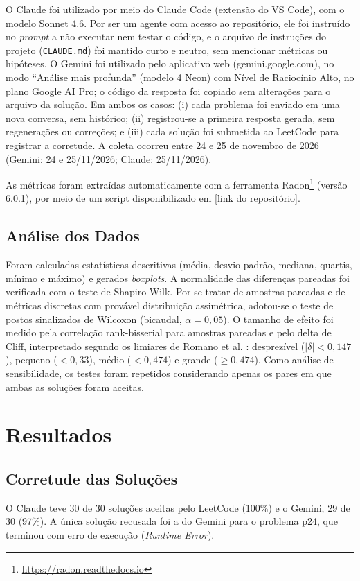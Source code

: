 \documentclass[12pt]{article}
\begin{document}
O Claude foi utilizado por meio do Claude Code (extensão do VS Code), com o modelo Sonnet 4.6.
Por ser um agente com acesso ao repositório, ele foi instruído no \emph{prompt} a não executar
nem testar o código, e o arquivo de instruções do projeto (\texttt{CLAUDE.md}) foi mantido
curto e neutro, sem mencionar métricas ou hipóteses. O Gemini foi utilizado pelo aplicativo web
(gemini.google.com), no modo ``Análise mais profunda'' (modelo 4 Neon) com Nível de Raciocínio
Alto, no plano Google AI Pro; o código da resposta foi copiado sem alterações para o arquivo da
solução. Em ambos os casos: (i) cada problema foi enviado em uma nova conversa, sem histórico;
(ii) registrou-se a primeira resposta gerada, sem regenerações ou correções; e (iii) cada
solução foi submetida ao LeetCode para registrar a corretude. A coleta ocorreu entre 24 e 25 de
novembro de 2026 (Gemini: 24 e 25/11/2026; Claude: 25/11/2026).

As métricas foram extraídas automaticamente com a ferramenta Radon\footnote{\url{https://radon.readthedocs.io}}
(versão 6.0.1), por meio de um script disponibilizado em [link do repositório].

\subsection{Análise dos Dados}
Foram calculadas estatísticas descritivas (média, desvio padrão, mediana, quartis, mínimo
e máximo) e gerados \emph{boxplots}. A normalidade das diferenças pareadas foi verificada
com o teste de Shapiro-Wilk. Por se tratar de amostras pareadas e de métricas discretas
com provável distribuição assimétrica, adotou-se o teste de postos sinalizados de Wilcoxon
(bicaudal, $\alpha = 0{,}05$). O tamanho de efeito foi medido pela correlação rank-bisserial
para amostras pareadas \cite{kerby2014} e pelo delta de Cliff, interpretado segundo os
limiares de Romano et al. \cite{romano2006}: desprezível ($|\delta| < 0{,}147$), pequeno ($< 0{,}33$),
médio ($< 0{,}474$) e grande ($\geq 0{,}474$). Como análise de sensibilidade, os testes
foram repetidos considerando apenas os pares em que ambas as soluções foram aceitas.

\section{Resultados}
\subsection{Corretude das Soluções}
O Claude teve 30 de 30 soluções aceitas pelo LeetCode (100\%) e o Gemini, 29 de 30 (97\%).
A única solução recusada foi a do Gemini para o problema p24, que terminou com erro de
execução (\emph{Runtime Error}).
\end{document}
